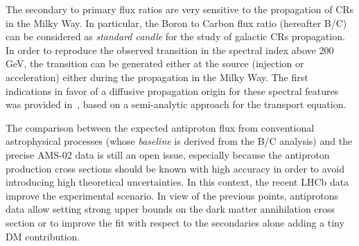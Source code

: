 \documentclass{PoS}
\begin{document}
The  secondary to primary flux ratios are very sensitive to the propagation of CRs in the Milky Way. In particular, the Boron to Carbon flux ratio (hereafter B/C) can be considered as \textit{standard candle} for the study of galactic CRs propagation. In order to reproduce the observed transition in the spectral index above 200 GeV, the transition can be generated  either at the source (injection or acceleration) 
either during the propagation in the Milky Way. The first indications in favor of a diffusive propagation origin for these spectral features was provided in~\cite{Genolini:2017dfb}, based on a semi-analytic approach for the transport equation. 


The comparison between the expected antiproton flux from conventional astrophysical processes (whose \textit{baseline} is derived from the B/C analysis) and the precise AMS-02 data is still an open issue, especially because the antiproton production cross sections should be known with high accuracy in order to avoid introducing high theoretical uncertainties. 
In this context, the recent  LHCb data improve the experimental scenario. In view of the previous points, antiprotons data allow setting strong upper bounds on the dark matter annihilation cross section or to improve the fit with respect to the secondaries 
alone adding a tiny DM contribution. 

\end{document}
